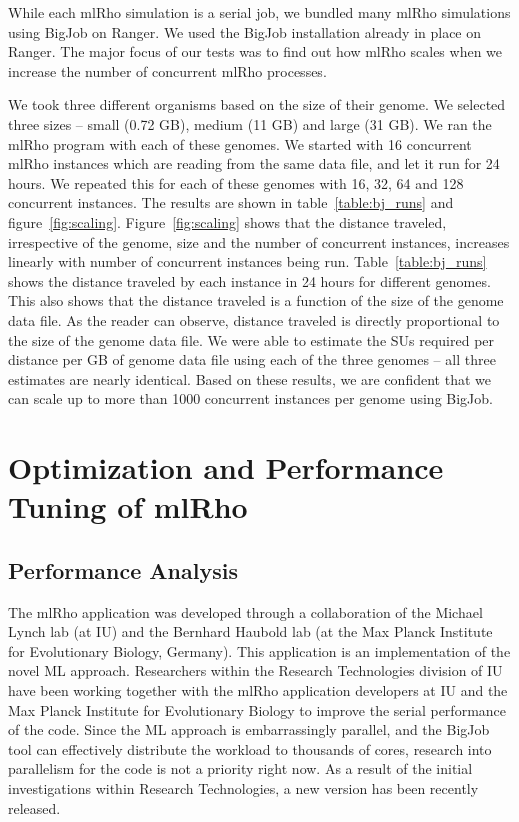 \documentclass{sig-alternate}
\begin{document}
While each mlRho simulation is a serial job, we bundled many mlRho simulations using BigJob on Ranger. 
We used the BigJob installation already in place on Ranger. The major focus of our tests was to find out how mlRho scales when we increase the number of concurrent mlRho processes. 

We took three different organisms based on the size of their genome. We selected three sizes -- small (0.72 GB), medium (11 GB) and large (31 GB). We ran the mlRho program with each of these genomes. We started with 16 concurrent mlRho instances which are reading from the same data file, and let it run for 24 hours. We repeated this for each of these genomes with 16, 32, 64 and 128 concurrent instances. The results are shown in table~\ref{table:bj_runs} and figure~\ref{fig:scaling}.
Figure~\ref{fig:scaling} shows that the distance traveled, irrespective of the genome, size and the number of concurrent instances, increases linearly with number of concurrent instances being run. Table~\ref{table:bj_runs} shows the distance traveled by each instance in 24 hours for different genomes. This also shows that the distance traveled is a function of the size of the genome data file. As the reader can observe, distance traveled is directly proportional to the size of the genome data file. We were able to estimate the SUs required per distance per GB of genome data file using each of the three genomes -- all three estimates are nearly identical. Based on these results, we are confident that we can scale up to more than 1000 concurrent instances per genome using BigJob.




\section{Optimization and Performance Tuning of mlRho}\label{sec:optimization}
\subsection{Performance Analysis}\label{subsec:analysis}
The mlRho application was developed through a collaboration of the Michael Lynch lab (at IU) and the Bernhard
Haubold lab (at the Max Planck Institute for Evolutionary Biology, Germany). This application is an implementation of
the novel ML approach. Researchers within the Research Technologies division of IU have been working together
with the mlRho application developers at IU and the Max Planck Institute for Evolutionary Biology to improve
the serial performance of the code. Since the ML approach is embarrassingly parallel, and the BigJob tool can
effectively distribute the workload to thousands of cores, research into parallelism for the code is not a priority right now. As a result of the initial investigations within Research Technologies, a new version has been recently released. 
\end{document}

